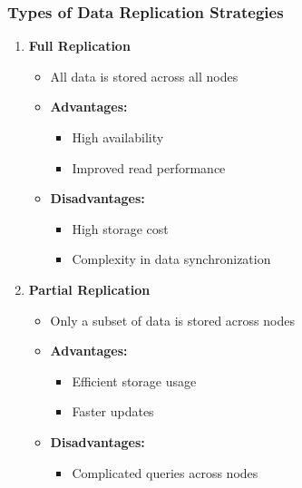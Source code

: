 \documentclass[aspectratio=169]{beamer}
\begin{document}
\begin{frame}[fragile]
    \frametitle{Types of Data Replication Strategies}
    \begin{enumerate}
        \item \textbf{Full Replication}
            \begin{itemize}
                \item All data is stored across all nodes
                \item \textbf{Advantages:}
                    \begin{itemize}
                        \item High availability
                        \item Improved read performance
                    \end{itemize}
                \item \textbf{Disadvantages:}
                    \begin{itemize}
                        \item High storage cost
                        \item Complexity in data synchronization
                    \end{itemize}
            \end{itemize}
        
        \item \textbf{Partial Replication}
            \begin{itemize}
                \item Only a subset of data is stored across nodes
                \item \textbf{Advantages:}
                    \begin{itemize}
                        \item Efficient storage usage
                        \item Faster updates
                    \end{itemize}
                \item \textbf{Disadvantages:}
                    \begin{itemize}
                        \item Complicated queries across nodes
                    \end{itemize}
            \end{itemize}
    \end{enumerate}
\end{frame}
\end{document}
